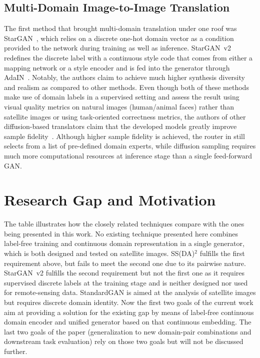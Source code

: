 \documentclass[runningheads]{llncs}
\begin{document}
\subsection{Multi-Domain Image-to-Image Translation}
The first method that brought multi-domain translation under one roof was StarGAN~\cite{choi2018stargan}, which relies on a discrete one-hot domain vector as a condition provided to the network during training as well as inference. StarGAN~v2~\cite{choi2020starganv2} redefines the discrete label with a continuous style code that comes from either a mapping network or a style encoder and is fed into the generator through AdaIN~\cite{huang2017adain}. Notably, the authors claim to achieve much higher synthesis diversity and realism as compared to other methods. Even though both of these methods make use of domain labels in a supervised setting and assess the result using visual quality metrics on natural images (human/animal faces) rather than satellite images or using task-oriented correctness metrics, the authors of other diffusion-based translators claim that the developed models greatly improve sample fidelity~\cite{vinholi2024multisensor,kieu2025universal}. Although higher sample fidelity is achieved, the router in \cite{kieu2025universal} still selects from a list of pre-defined domain experts, while diffusion sampling requires much more computational resources at inference stage than a single feed-forward GAN.

\section{Research Gap and Motivation}
\label{sec:gap}
The table illustrates how the closely related techniques compare with the ones being presented in this work. No existing technique presented here combines label-free training and continuous domain representation in a single generator, which is both designed and tested on satellite images. SS(DA)$^2$ fulfills the first requirement above, but fails to meet the second one due to its pairwise nature. StarGAN~v2 fulfills the second requirement but not the first one as it requires supervised discrete labels at the training stage and is neither designed nor used for remote-sensing data. StandardGAN is aimed at the analysis of satellite images but requires discrete domain identity. Now the first two goals of the current work aim at providing a solution for the existing gap by means of label-free continuous domain encoder and unified generator based on that continuous embedding. The last two goals of the paper (generalization to new domain-pair combinations and downstream task evaluation) rely on those two goals but will not be discussed further.
\end{document}
